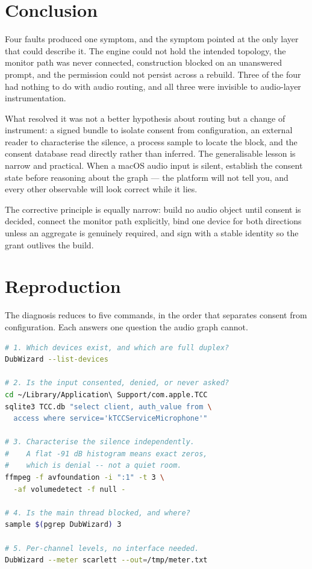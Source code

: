 \documentclass[10pt,letterpaper,twocolumn]{article}
\begin{document}
\section{Conclusion}

Four faults produced one symptom, and the symptom pointed at the only layer that could describe it. The engine could not hold the intended topology, the monitor path was never connected, construction blocked on an unanswered prompt, and the permission could not persist across a rebuild. Three of the four had nothing to do with audio routing, and all three were invisible to audio-layer instrumentation.

What resolved it was not a better hypothesis about routing but a change of instrument: a signed bundle to isolate consent from configuration, an external reader to characterise the silence, a process sample to locate the block, and the consent database read directly rather than inferred. The generalisable lesson is narrow and practical. When a macOS audio input is silent, establish the consent state before reasoning about the graph --- the platform will not tell you, and every other observable will look correct while it lies.

The corrective principle is equally narrow: build no audio object until consent is decided, connect the monitor path explicitly, bind one device for both directions unless an aggregate is genuinely required, and sign with a stable identity so the grant outlives the build.

\section{Reproduction}

The diagnosis reduces to five commands, in the order that separates consent from configuration. Each answers one question the audio graph cannot.

\begin{lstlisting}[language=bash]
# 1. Which devices exist, and which are full duplex?
DubWizard --list-devices

# 2. Is the input consented, denied, or never asked?
cd ~/Library/Application\ Support/com.apple.TCC
sqlite3 TCC.db "select client, auth_value from \
  access where service='kTCCServiceMicrophone'"

# 3. Characterise the silence independently.
#    A flat -91 dB histogram means exact zeros,
#    which is denial -- not a quiet room.
ffmpeg -f avfoundation -i ":1" -t 3 \
  -af volumedetect -f null -

# 4. Is the main thread blocked, and where?
sample $(pgrep DubWizard) 3

# 5. Per-channel levels, no interface needed.
DubWizard --meter scarlett --out=/tmp/meter.txt
\end{lstlisting}
\end{document}
